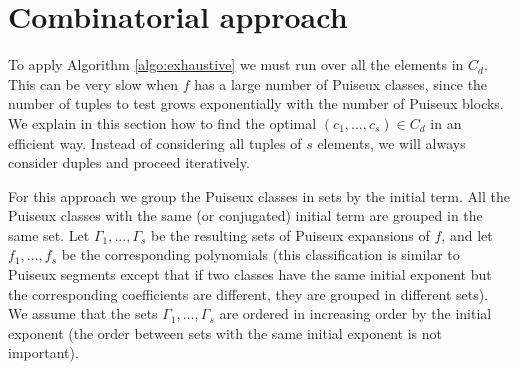 \documentclass[a4paper,11pt]{amsart}%
\theoremstyle{definition}
\theoremstyle{plain}
\theoremstyle{remark}
\begin{document}
\section{Combinatorial approach}

%
%
%
%

To apply Algorithm \ref{algo:exhaustive} we must run over all the elements
in $C_{d}$. This can be very slow when $f$ has a large number of Puiseux classes, since the number of tuples to test grows exponentially with the number of Puiseux blocks.
We explain in this section how to find the optimal $(c_{1}, \dots, c_{s}) \in C_{d}$ in an
efficient way. Instead of considering all tuples of $s$ elements, we will always
consider duples and proceed iteratively.

For this approach we group the Puiseux classes in sets by the initial term. All the Puiseux classes with the same (or conjugated) initial term are grouped in the same set. Let $\Gamma_1, \dots, \Gamma_s$ be the resulting sets of Puiseux expansions of $f$, and let $f_1, \dots, f_s$ be the corresponding polynomials (this classification is similar to Puiseux segments except that if two classes have the same initial exponent but the corresponding coefficients are different, they are grouped in different sets).
We assume that the sets $\Gamma_1, \dots, \Gamma_s$ are ordered in increasing order by the initial exponent (the order between sets with the same initial exponent is not important).
\end{document}
